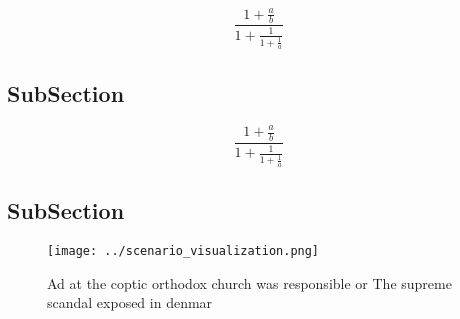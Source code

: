 \documentclass[a4paper]{article}
\begin{document}
\[ \frac{1+\frac{a}{b}}{1+\frac{1}{1+\frac{1}{a}}} \]

\subsection{SubSection}

\[ \frac{1+\frac{a}{b}}{1+\frac{1}{1+\frac{1}{a}}} \]

\subsection{SubSection}

\begin{figure}
\centering
\texttt{[image: ../scenario\_visualization.png]}
\caption{Ad at the coptic orthodox church was responsible or The supreme scandal exposed in denmar
}
\end{figure}
 
\end{document}
